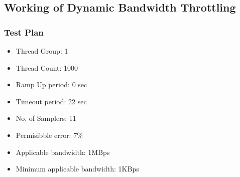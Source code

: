 \documentclass[12pt]{beamer}
\begin{document}
  \subsection{Working of Dynamic Bandwidth Throttling}
   \begin{frame}
   \frametitle{Test Plan}

\begin{minipage}[t]{0.48\linewidth}
  \begin{itemize}
        \item Thread Group: 1
        \item Thread Count: 1000
        \item Ramp Up period: 0 sec
        \item Timeout period: 22 sec
        \item No. of Samplers: 11
        \item Permisibble error: 7\%
        \item Applicable bandwidth: 1MBps
        \item Minimum applicable bandwidth: 1KBps
  \end{itemize}
  \end{minipage}\hfill
  \begin{minipage}[t]{0.48\linewidth}
    \vspace{-1cm}

    \end{minipage}
   \end{frame}
\end{document}
